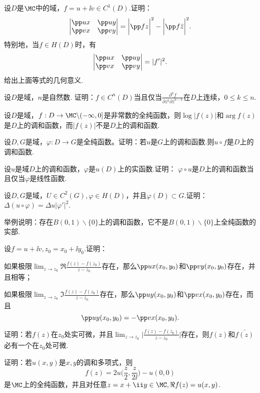 \begin{xiti}
\item 设$D$是$\MC$中的域，$f=u+\ii v\in C^1(D)$.证明：
\[\begin{vmatrix}
\pp ux&\pp uy\\\pp vx&\pp vy
\end{vmatrix}=\bigg|\pp fz\bigg|^2-\bigg|\pp f{\bar z}\bigg|^2.\]
特别地，当$f\in H(D)$时，有
\[\begin{vmatrix}
\pp ux&\pp uy\\\pp vx&\pp vy
\end{vmatrix}=|f'|^2.\]
给出上面等式的几何意义.
\item 设$D$是域，$n$是自然数. 证明：$f\in C^n(D)$当且仅当$\frac{\partial^nf}{\partial z^k\partial\bar z^{n-k}}$在$D$上连续，$0\le k\le n$.
\item 设$D$是域，$f:D\to\MC\backslash(-\infty,0]$是非常数的全纯函数，则$\log |f(z)|$和$\arg f(z)$是$D$上的调和函数，而$|f(z)|$不是$D$上的调和函数.
\item 设$D,G$是域，$\varphi:D\to G$是全纯函数。证明：若$u$是$G$上的调和函数.则$u\circ f$是$D$上的调和函数.
\item 设$u$是域$D$上的调和函数，$\varphi$是$u(D)$上的实函数.证明：
$\varphi\circ u$是$D$上的调和函数当且仅当$\varphi$是线性函数.
\item 设$D,G$是域，$U\in C^2(G),\varphi\in H(D)$，并且$\varphi(D)\subset G$.证明：$\Delta (u\circ \varphi)=\Delta u|\varphi'|^2$.
\item 举例说明：存在$B(0,1)\backslash\{0\}$上的调和函数，它不是$B(0,1)\backslash\{0\}$上全纯函数的实部.
\item 设$f=u+\ii v,z_0=x_0+\ii y_0$.证明：
\begin{enuma}
  \item 如果极限$\lim_{z\to z_0}\Re\frac{f(z)-f(z_0)}{z-z_0}$存在，那么$\pp ux(x_0,y_0)$和$\pp vy(x_0,y_0)$存在，并且相等；
  \item 如果极限$\lim_{z\to z_0}\Im\frac{f(z)-f(z_0)}{z-z_0}$存在，那么$\pp uy(x_0,y_0)$和$\pp vx(x_0,y_0)$存在，而且
      \[\pp uy(x_0,y_0)=-\pp vx(x_0,y_0).\]
\end{enuma}
\item 证明：若$f(z)$在$z_0$处实可微，并且$\lim_{z\to z_0}\bigg|\frac{f(z)-f(z_0)}{z-z_0}\bigg|$存在，则$f(z)$和$\bar{f(z)}$必有一个在$z_0$处可微.
\item 证明：若$u(x,y)$是$x,y$的调和多项式，则
\[f(z)=2u\bigg(\frac z2,\frac z{2\ii}\bigg)-u(0,0)\]
是$\MC$上的全纯函数，并且对任意$z=x+\ii y\in\MC,\Re f(z)=u(x,y)$.
\end{xiti}

